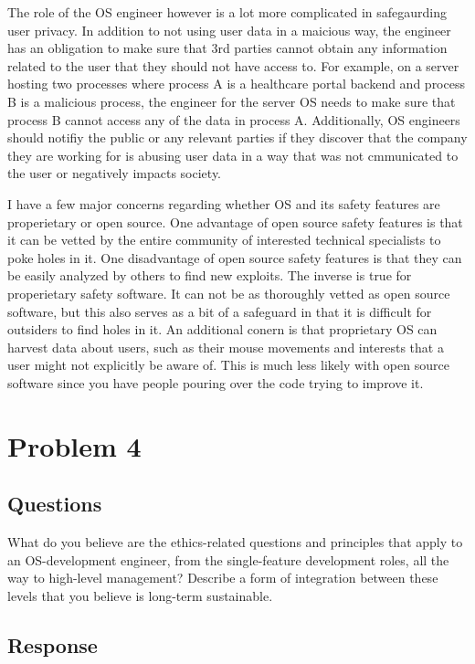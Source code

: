 \documentclass{assignment-x}
\begin{document}
The role of the OS engineer however is a lot more complicated in safegaurding user privacy. In addition to not using user data in a maicious way, the engineer has an obligation to make sure that 3rd parties cannot obtain any information related to the user that they should not have access to. For example, on a server hosting two processes where process A is a healthcare portal backend and process B is a malicious process, the engineer for the server OS needs to make sure that process B cannot access any of the data in process A. Additionally, OS engineers should notifiy the public or any relevant parties if they discover that the company they are working for is abusing user data in a way that was not cmmunicated to the user or negatively impacts society.

I have a few major concerns regarding whether OS and its safety features are properietary or open source. One advantage of open source  safety features is that it can  be vetted by the entire community of interested technical specialists to poke holes in it.  One disadvantage of open source safety features is that they can be easily analyzed by others to find new exploits. The inverse is true for properietary safety software. It can not be as thoroughly vetted as open source software, but this also serves as a bit of a safeguard in that it is difficult for outsiders to find holes in it. An additional conern is that proprietary OS can harvest data about users, such as their mouse movements and interests that a user might not explicitly be aware of. This is much less likely with open source software since you have people pouring over the code trying to improve it.

\section{Problem 4}
\subsection{Questions}
What do you believe are the ethics-related questions and principles that apply to an OS-development engineer, from the single-feature development roles, all the way to high-level management?
Describe a form of integration between these levels that you believe is long-term sustainable.
\subsection{Response}

\pagebreak


\end{document}
